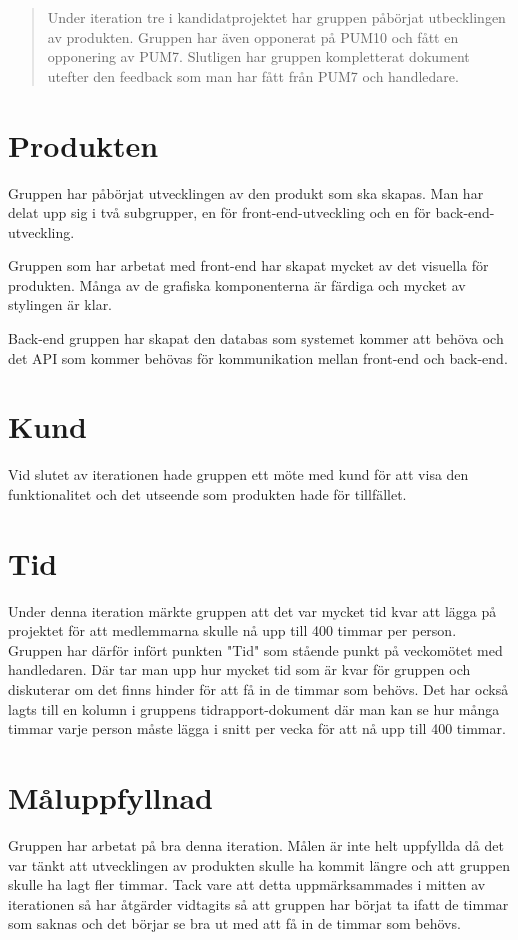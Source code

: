 \documentclass[a4paper,10pt, twoside]{article}
\begin{document}


\clearpage
\begin{abstract}
\noindent Under iteration tre i kandidatprojektet har gruppen påbörjat utbecklingen av produkten. Gruppen har även opponerat på PUM10 och fått en opponering av PUM7.
Slutligen har gruppen kompletterat dokument utefter den feedback som man har fått från PUM7 och handledare.
\end{abstract}
\clearpage

\section{Produkten}
\label{sec:Produkten}
Gruppen har påbörjat utvecklingen av den produkt som ska skapas. Man har delat upp sig i två subgrupper, en för front-end-utveckling och en för back-end-utveckling.

Gruppen som har arbetat med front-end har skapat mycket av det visuella för produkten. Många av de grafiska komponenterna är färdiga och mycket av stylingen är klar.

Back-end gruppen har skapat den databas som systemet kommer att behöva och det API som kommer behövas för kommunikation mellan front-end och back-end.

\section{Kund}
Vid slutet av iterationen hade gruppen ett möte med kund för att visa den funktionalitet och det utseende som produkten hade för tillfället.

\section{Tid}
Under denna iteration märkte gruppen att det var mycket tid kvar att lägga på projektet för att medlemmarna skulle nå upp till 400 timmar per person. Gruppen har därför infört punkten "Tid" som stående punkt på veckomötet med handledaren. Där tar man upp hur mycket tid som är kvar för gruppen och diskuterar om det finns hinder för att få in de timmar som behövs.
Det har också lagts till en kolumn i gruppens tidrapport-dokument där man kan se hur många timmar varje person måste lägga i snitt per vecka för att nå upp till 400 timmar.

\section{Måluppfyllnad}
Gruppen har arbetat på bra denna iteration. Målen är inte helt uppfyllda då det var tänkt att utvecklingen av produkten skulle ha kommit längre och att gruppen skulle ha lagt fler timmar. Tack vare att detta uppmärksammades i mitten av iterationen så har åtgärder vidtagits så att gruppen har börjat ta ifatt de timmar som saknas och det börjar se bra ut med att få in de timmar som behövs.
\end{document}
